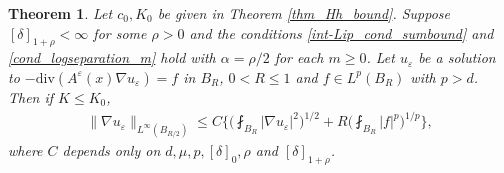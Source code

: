 \documentclass[reqno,12pt]{amsart} %
\newtheorem{theorem}{Theorem}[section]
\theoremstyle{definition}
\theoremstyle{remark}
\numberwithin{equation}{section}
\newcommand{\e}{\varepsilon}
\begin{document}
\begin{theorem}\label{int-lip_lem_Lip}
  Let $c_0, K_0$ be given in Theorem \ref{thm_Hh_bound}. Suppose $[\delta]_{1+\rho}<\infty$ for some $\rho>0$ and the conditions \eqref{int-Lip_cond_sumbound} and \eqref{cond_logseparation_m} hold with $\alpha=\rho/2$ for each $m\geq 0$. Let $u_\varepsilon$ be a solution to $-\mathrm{div}(A^\varepsilon(x)\nabla u_\varepsilon)=f$ in $B_{R}$, $0<R\leq 1$ and $f\in L^p(B_{R})$ with $p>d$. Then if $K\leq K_0$, 
  \begin{align*}
    \| \nabla u_\e \|_{L^\infty(B_{R/2})} \leq C\bigg\{\bigg(\fint_{B_{R}}|\nabla u_\varepsilon|^2\bigg)^{1/2}+R\bigg(\fint_{B_{R}}|f|^p\bigg)^{1/p}\bigg\},
  \end{align*}
  where $C$ depends only on $d, \mu, p, [\delta]_0, \rho$ and $[\delta]_{1+\rho}$. 
\end{theorem}
\end{document}
